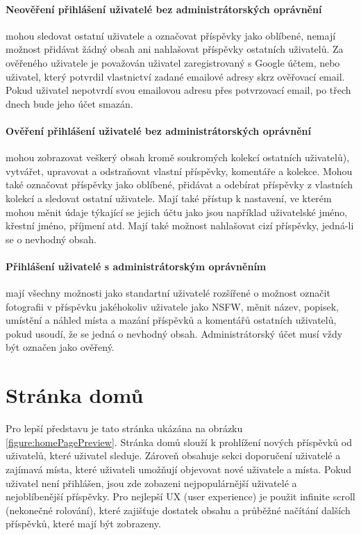 \documentclass[12pt, a4paper,
 twoside,        %
 openright
]{report}
\begin{document}
\paragraph{Neověření přihlášení uživatelé bez administrátorských oprávnění} mohou sledovat ostatní uživatele a označovat příspěvky jako oblíbené, nemají možnost přidávat žádný obsah ani nahlašovat příspěvky ostatních uživatelů. Za ověřeného uživatele je považován uživatel zaregistrovaný s Google účtem, nebo uživatel, který potvrdil vlastnictví zadané emailové adresy skrz ověřovací email. Pokud uživatel nepotvrdí svou emailovou adresu přes potvrzovací email, po třech dnech bude jeho účet smazán.
\paragraph{Ověření přihlášení uživatelé bez administrátorských oprávnění} mohou zobrazovat veškerý obsah kromě soukromých kolekcí ostatních uživatelů), vytvářet, upravovat a odstraňovat vlastní příspěvky, komentáře a kolekce. Mohou také označovat příspěvky jako oblíbené, přidávat a odebírat příspěvky z vlastních kolekcí a sledovat ostatní uživatele. Mají také přístup k nastavení, ve kterém mohou měnit údaje týkající se jejich účtu jako jsou například uživatelské jméno, křestní jméno, příjmení atd. Mají také možnost nahlašovat cizí příspěvky, jedná-li se o nevhodný obsah.
\paragraph{Přihlášení uživatelé s administrátorským oprávněním}\label{paragraph:usersWithAdminPermissions} mají všechny možnosti jako standartní uživatelé rozšířené o možnost označit fotografii v příspěvku jakéhokoliv uživatele jako NSFW, měnit název, popisek, umístění a náhled místa a mazání příspěvků a komentářů ostatních uživatelů, pokud usoudí, že se jedná o nevhodný obsah. Administrátorský účet musí vždy být označen jako ověřený.

\section{Stránka domů}
Pro lepší představu je tato stránka ukázána na obrázku \ref{figure:homePagePreview}. Stránka domů slouží k prohlížení nových příspěvků od uživatelů, které uživatel sleduje. Zároveň obsahuje sekci doporučení uživatelé a zajímavá místa, které uživateli umožňují objevovat nové uživatele a místa. Pokud uživatel není přihlášen, jsou zde zobazeni nejpopulárnější uživatelé a nejoblíbenější příspěvky. Pro nejlepší UX (user experience) je použit infinite scroll (nekonečné rolování), které zajišťuje dostatek obsahu a průběžné načítání dalších příspěvků, které mají být zobrazeny.
\end{document}
